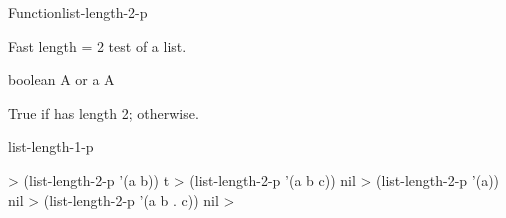 \documentclass[10pt,twoside,english,pdftex]{article}
\begin{document}

\begin{functiondoc}{Function}{list-length-2-p}%
  {
    \returns{} }
%
%

\fnsyntax

\fnpurpose Fast length = 2 test of a list.

\fnpackage {}

\fnmodule {}

\fnargs
\begin{args}{boolean}
\arg[list] A  or a 
\arg[boolean] A 
\end{args}

\fnreturns True if  has length 2; \nil{} otherwise.

\begin{alsos}{list-length-1-p}
\end{alsos}

\fnexamples
%
\W\supp
\begin{example}
  > (list-length-2-p '(a b))
  t
  > (list-length-2-p '(a b c))
  nil
  > (list-length-2-p '(a))
  nil
  > (list-length-2-p '(a b . c))
  nil
  >
\end{example}

\end{functiondoc}

\end{document}
